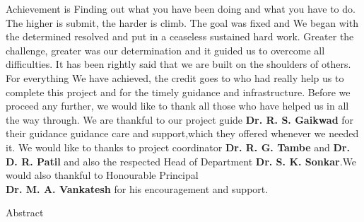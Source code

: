 \documentclass[oneside,a4paper,12pt]{report}
\begin{document}
Achievement is Finding out what you have been doing and what you have to do. The higher is submit, the harder is climb. The goal was fixed and We began with the determined resolved and put in a ceaseless sustained hard work. Greater the challenge, greater was our determination and it guided us to overcome all difficulties. It has been rightly said that we are built on the shoulders of others. For everything We have achieved, the credit goes to who had really help us to complete this project and for the timely guidance and infrastructure. Before we proceed any further, we would like to thank all those who have helped us in all the way through. We are thankful to our project guide \textbf{Dr. R. S. Gaikwad}  for their guidance guidance care and support,which they offered whenever we needed it. We would like to thanks to project coordinator \textbf{Dr. R. G. Tambe} and \textbf{Dr. D. R. Patil} and also the respected Head of Department \textbf{Dr. S. K. Sonkar}.We would also thankful to Honourable Principal\\ \textbf{Dr. M. A. Vankatesh} for his encouragement and support.\\
\newpage
{}
\newpage
{\fontsize{16}{15} \bfseries \LARGE \selectfont \centerline{Abstract}}
\vspace{10mm}
\end{document}
